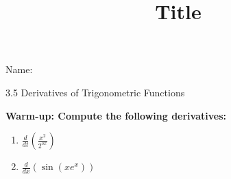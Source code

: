 \documentclass[12pt]{article}
\title{Title}
\begin{document}

 Name:
 \begin{center}\large{3.5 Derivatives of Trigonometric Functions}\end{center}
 

 \begin{tcolorbox}
 
\bf{Warm-up:} Compute the following derivatives:
 	\begin{enumerate}
	\item $\displaystyle \frac{d}{dt}\left(\frac{x^{2}}{2^{3x}}\right)$
\vfill
	\item $\displaystyle \frac{d}{dx}\left(\sin\left(xe^{x}\right)\right)$
	\vfill
	
	\end{enumerate}
 \end{tcolorbox}
	
\end{document}
